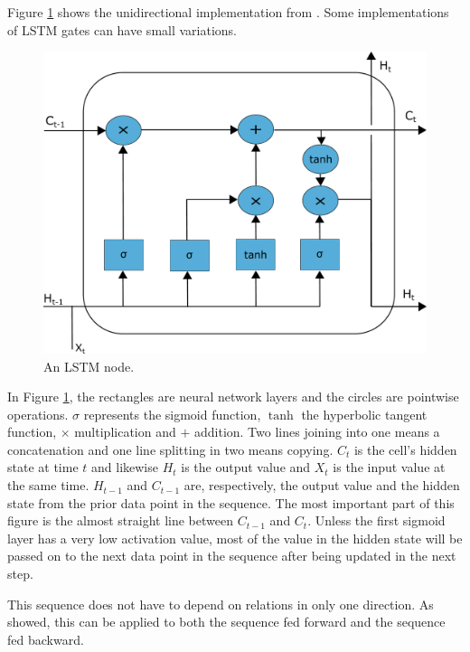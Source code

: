 \documentclass[nofilelist]{cslthse-msc}
\begin{document}
Figure \ref{fig:LSTMnode} shows the unidirectional implementation from \citet{gers1999learning}. Some implementations of LSTM gates can have small variations.

\begin{figure}[ht]
    \centering
    \includegraphics[width=\textwidth]{LSTMnode.pdf}
    \caption{An LSTM node.}
    \label{fig:LSTMnode}
\end{figure}

In Figure \ref{fig:LSTMnode}, the rectangles are neural network layers and the circles are pointwise operations.  $\sigma$ represents the sigmoid function, $\tanh$ the hyperbolic tangent function, $\times$ multiplication and $+$ addition. Two lines joining into one means a concatenation and one line splitting in two means copying. $C_t$ is the cell's hidden state at time $t$ and likewise $H_t$ is the output value and $X_t$ is the input value at the same time. $H_{t-1}$ and $C_{t-1}$ are, respectively, the output value and the hidden state from the prior data point in the sequence. The most important part of this figure is the almost straight line between $C_{t-1}$ and $C_{t}$. Unless the first sigmoid layer has a very low activation value, most of the value in the hidden state will be passed on to the next data point in the sequence after being updated in the next step.

This sequence does not have to depend on relations in only one direction. As \citet{graves2005framewise} showed, this can be applied to both the sequence fed forward and the sequence fed backward. 
\end{document}
